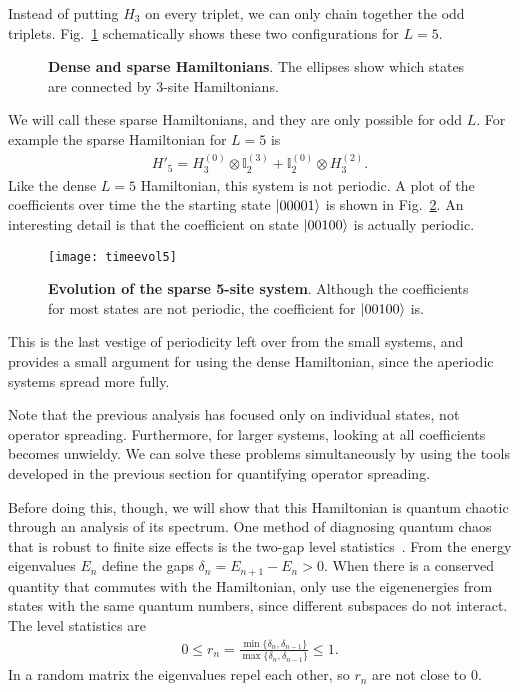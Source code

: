 Instead of putting $H_3$ on every triplet, we can only chain together the odd triplets. Fig.~\ref{fig:sparsedense} schematically shows these two configurations for $L=5$.
\begin{figure}
	\centering
	
	\caption{\textbf{Dense and sparse Hamiltonians}. The ellipses show which states are connected by 3-site Hamiltonians.}
	\label{fig:sparsedense}
\end{figure}
We will call these sparse Hamiltonians, and they are only possible for odd $L$. For example the sparse Hamiltonian for $L=5$ is
\begin{align}
H'_5 = H_3^{(0)}\otimes\mathbb{I}_2^{(3)} + \mathbb{I}_2^{(0)}\otimes H_3^{(2)}.
\end{align}
Like the dense $L=5$ Hamiltonian, this system is not periodic. A plot of the coefficients over time the the starting state $\left|00001\right\rangle$ is shown in Fig.~\ref{fig:timeevol5}. An interesting detail is that the coefficient on state $\left|00100\right\rangle$ is actually periodic. 
\begin{figure}
	\centering
	\texttt{[image: timeevol5]}
	\caption{\textbf{Evolution of the sparse 5-site system}. Although the coefficients for most states are not periodic, the coefficient for $\left|00100\right\rangle$ is.}
	\label{fig:timeevol5}
\end{figure} 
This is the last vestige of periodicity left over from the small systems, and provides a small argument for using the dense Hamiltonian, since the aperiodic systems spread more fully.

Note that the previous analysis has focused only on individual states, not operator spreading. Furthermore, for larger systems, looking at all coefficients becomes unwieldy. We can solve these problems simultaneously by using the tools developed in the previous section for quantifying operator spreading.

Before doing this, though, we will show that this Hamiltonian is quantum chaotic through an analysis of its spectrum. One method of diagnosing quantum chaos that is robust to finite size effects is the two-gap level statistics~\cite{Oganesyan2007}. From the energy eigenvalues $E_n$ define the gaps $\delta_n= E_{n+1}-E_n>0$. When there is a conserved quantity that commutes with the Hamiltonian, only use the eigenenergies from states with the same quantum numbers, since different subspaces do not interact. The level statistics are
\begin{align}
0\le r_n=\frac{\min\{\delta_n,\delta_{n-1}\}}{\max\{\delta_n,\delta_{n-1}\}}
	\le1.\label{eqn:levelstats}
\end{align}
In a random matrix the eigenvalues repel each other, so $r_n$ are not close to 0.

